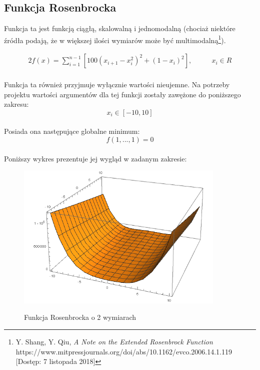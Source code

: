 \documentclass[twoside]{projektInzynierskiMS1}
\newcommand{\si}{ś}
\begin{document}
	\subsection{Funkcja Rosenbrocka}
Funkcja ta jest funkcją ciągłą, skalowalną i jednomodalną (chociaż niektóre źródła podają, że w większej ilo\si ci wymiarów może być multimodalną\footnote{Y. Shang, Y. Qiu, \textit{A Note on the Extended Rosenbrock Function} https://www.mitpressjournals.org/doi/abs/10.1162/evco.2006.14.1.119 [Dostęp: 7 listopada 2018]}).



\begin{alignat*}{2}
f(x) = \sum_{i=1}^{n-1} \left[100\left(x_{i+1} - x_i^2\right)^2 + \left(1- x_i\right)^2\right],&\qquad  x_i \in R\\
\end{alignat*}

Funkcja ta również przyjmuje wyłącznie warto\si ci nieujemne. Na potrzeby projektu warto\si ci argumentów dla tej funkcji zostały zawężone do poniższego zakresu:
\[x_i \in [-10, 10] \] \\

Posiada ona następujące globalne minimum:
\[ f(1,...,1) = 0 \] \\

Poniższy wykres prezentuje jej wygląd w zadanym zakresie:\\
\begin{figure}[H]
	\begin{center}
		\includegraphics[height=7cm]{pics/rosenbrockFunction1.png}\\
	\end{center}
	\caption{Funkcja Rosenbrocka o 2 wymiarach}
\end{figure}
\end{document}
